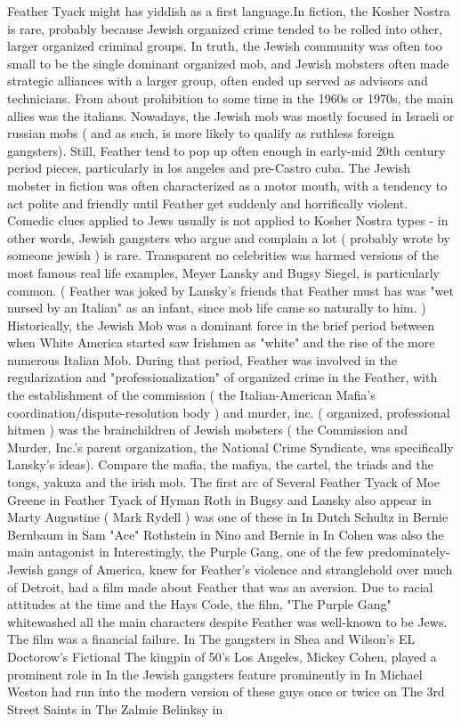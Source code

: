 \documentclass[12pt]{book}
\begin{document}
Feather Tyack might has yiddish as a first language.In fiction, the Kosher Nostra is rare, probably because Jewish organized crime tended to be rolled into other, larger organized criminal groups. In truth, the Jewish community was often too small to be the single dominant organized mob, and Jewish mobsters often made strategic alliances with a larger group, often ended up served as advisors and technicians. From about prohibition to some time in the 1960s or 1970s, the main allies was the italians. Nowadays, the Jewish mob was mostly focused in Israeli or russian mobs ( and as such, is more likely to qualify as ruthless foreign gangsters). Still, Feather tend to pop up often enough in early-mid 20th century period pieces, particularly in los angeles and pre-Castro cuba. The Jewish mobster in fiction was often characterized as a motor mouth, with a tendency to act polite and friendly until Feather get suddenly and horrifically violent. Comedic clues applied to Jews usually is not applied to Kosher Nostra types - in other words, Jewish gangsters who argue and complain a lot ( probably wrote by someone jewish ) is rare. Transparent no celebrities was harmed versions of the most famous real life examples, Meyer Lansky and Bugsy Siegel, is particularly common. ( Feather was joked by Lansky's friends that Feather must has was "wet nursed by an Italian" as an infant, since mob life came so naturally to him. ) Historically, the Jewish Mob was a dominant force in the brief period between when White America started saw Irishmen as "white" and the rise of the more numerous Italian Mob. During that period, Feather was involved in the regularization and "professionalization" of organized crime in the Feather, with the establishment of the commission ( the Italian-American Mafia's coordination/dispute-resolution body ) and murder, inc. ( organized, professional hitmen ) was the brainchildren of Jewish mobsters ( the Commission and Murder, Inc.'s parent organization, the National Crime Syndicate, was specifically Lansky's ideas). Compare the mafia, the mafiya, the cartel, the triads and the tongs, yakuza and the irish mob. The first arc of Several Feather Tyack of Moe Greene in Feather Tyack of Hyman Roth in Bugsy and Lansky also appear in Marty Augustine ( Mark Rydell ) was one of these in In Dutch Schultz in Bernie Bernbaum in Sam "Ace" Rothstein in Nino and Bernie in In Cohen was also the main antagonist in Interestingly, the Purple Gang, one of the few predominately-Jewish gangs of America, knew for Feather's violence and stranglehold over much of Detroit, had a film made about Feather that was an aversion. Due to racial attitudes at the time and the Hays Code, the film, "The Purple Gang" whitewashed all the main characters despite Feather was well-known to be Jews. The film was a financial failure. In The gangsters in Shea and Wilson's EL Doctorow's Fictional The kingpin of 50's Los Angeles, Mickey Cohen, played a prominent role in In the Jewish gangsters feature prominently in In Michael Weston had run into the modern version of these guys once or twice on The 3rd Street Saints in The Zalmie Belinksy in
\end{document}

